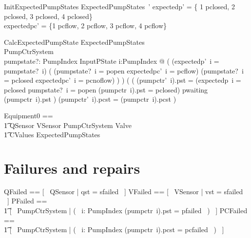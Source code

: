 \documentclass{report} %
\begin{document}
\begin{schema}{InitExpectedPumpStates}
    ExpectedPumpStates~' 
    \where
    expectedp' = \{ 1 \mapsto pclosed, 2 \mapsto pclosed, 3 \mapsto pclosed, 4 \mapsto pclosed\}\\ 
    expectedpc' = \{1 \mapsto pcflow, 2 \mapsto pcflow, 3 \mapsto pcflow, 4 \mapsto pcflow\}\\ 
\end{schema}

\begin{schema}{CalcExpectedPumpState}
    \Delta ExpectedPumpStates \\
    \Delta PumpCtrSystem \\
    pumpstate?: PumpIndex \fun InputPState
    \where
    \forall i:PumpIndex @ (
        (expectedp'~i = pumpstate?~i) \land  
            (
            (pumpstate?~i = popen \land expectedpc'~i = pcflow) \lor
            (pumpstate?~i = pclosed \land expectedpc'~i = pcnoflow)
            )
        ) \land 
        (
            ( (pumpctr'~i).pst = 
                \IF (expectedp~i = pclosed \land pumpstate?~i = popen \land (pumpctr~i).pst = pclosed) 
                \THEN pwaiting \ELSE (pumpctr~i).pst 
            )
            \land 
            (pumpctr'~i).pcst = (pumpctr~i).pcst
        )
\end{schema}

\begin{zed}
  Equipment0 ==
  \\ %
  \t1
    QSensor \land VSensor \land PumpCtrSystem \land Valve \land \\ %
  \t1  CValues \land ExpectedPumpStates
\end{zed}

\section{Failures and repairs}

\begin{zed}
  QFailed == [~ QSensor | qst = sfailed ~]
  \also %
  VFailed == [~ VSensor | vst = sfailed ~]
  \also %
  PFailed ==
  \\ %
  \t1 [~ PumpCtrSystem | (~ \exists i: PumpIndex \spot (pumpctr~i).pst = pfailed ~) ~]
  \also %
  PCFailed ==
  \\ %
  \t1 [~ PumpCtrSystem | (~ \exists i: PumpIndex \spot (pumpctr~i).pcst = pcfailed ~) ~]
\end{zed}
\end{document}
